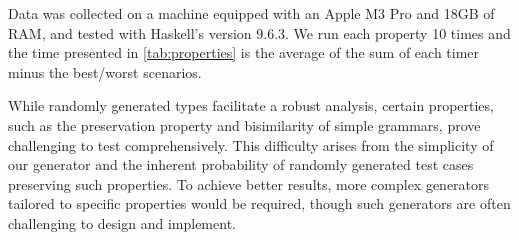 Data was collected on a machine equipped with an Apple M3 Pro and 18GB of RAM, and tested with Haskell's version 9.6.3. We run each property 10 times and the time presented in \cref{tab:properties} is the average of the sum of each timer minus the best/worst scenarios. 

While randomly generated types facilitate a robust analysis, certain properties, such as the preservation property and bisimilarity of simple grammars, prove challenging to test comprehensively. This difficulty arises from the simplicity of our generator and the inherent probability of randomly generated test cases preserving such properties. To achieve better results, more complex generators tailored to specific properties would be required, though such generators are often challenging to design and implement. 
